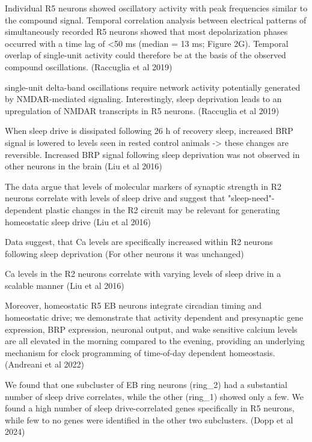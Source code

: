 Individual R5 neurons showed oscillatory activity with peak frequencies similar to the compound signal.
Temporal correlation analysis between electrical patterns of simultaneously recorded R5 neurons showed that most depolarization phases occurred with a time lag of <50 ms (median = 13 ms; Figure 2G). Temporal overlap of single-unit activity could therefore be at the basis of the observed compound oscillations.
\cite{raccugliaNetworkSpecificSynchronizationElectrical2019} (Raccuglia et al 2019)

single-unit delta-band oscillations require network activity potentially generated by NMDAR-mediated signaling. Interestingly, sleep deprivation leads to an upregulation of NMDAR transcripts in R5 neurons.
\cite{raccugliaNetworkSpecificSynchronizationElectrical2019} (Raccuglia et al 2019)



When sleep drive is dissipated following 26 h of recovery sleep, increased BRP signal is lowered to levels seen in rested
    control animals -> these changes are reversible. Increased BRP signal following sleep
    deprivation was not observed in other neurons in the brain \cite{liuSleepDriveEncoded2016}
    (Liu et al 2016)
    
    The data argue that levels of molecular markers of synaptic strength in R2 neurons correlate with levels of sleep
    drive and suggest that "sleep-need"-dependent plastic changes in the R2 circuit may be relevant for generating
    homeostatic sleep drive \cite{liuSleepDriveEncoded2016}
    (Liu et al 2016)

    Data suggest, that Ca levels are specifically increased within R2 neurons following sleep deprivation (For other neurons
    it was unchanged) \cite{liuSleepDriveEncoded2016}

    Ca levels in the R2 neurons correlate with varying levels of sleep drive in a scalable manner \cite{liuSleepDriveEncoded2016}
    (Liu et al 2016)

Moreover, homeostatic R5 EB neurons integrate circadian timing and homeostatic drive;
we demonstrate that activity dependent and presynaptic gene expression, BRP expression,
neuronal output, and wake sensitive calcium levels are all elevated in the morning
compared to the evening, providing an underlying mechanism for clock programming of
time-of-day dependent homeostasis.
\cite{andreaniCircadianProgrammingEllipsoid2022} (Andreani et al 2022)

We found that one subcluster of EB ring neurons (ring\_2) had a 
substantial number of sleep drive correlates, while the
other (ring\_1) showed only a few. We found a high number of sleep
drive-correlated genes specifically in R5 neurons,
while few to no genes were identified in the other two subclusters.
(Dopp et al 2024)


